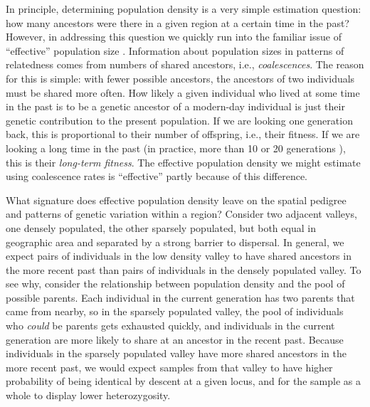 \documentclass{ar-1col}
\begin{document}
In principle, determining population density is a very simple estimation question:
how many ancestors were there in a given region at a certain time in the past?
However, in addressing this question we quickly run into the familiar
issue of ``effective'' population size \citep{CharlesworthCharlesworthBarton2003}.
Information about population sizes in patterns of relatedness
comes from numbers of shared ancestors, i.e., \textit{coalescences}.
The reason for this is simple:
with fewer possible ancestors, the ancestors of two individuals
must be shared more often.
How likely a given individual who lived at some time in the past
is to be a genetic ancestor of a modern-day individual
is just their genetic contribution to the present population.
If we are looking one generation back, 
this is proportional to their number of offspring, i.e., their fitness.
If we are looking a long time in the past
(in practice, more than 10 or 20 generations \citep{bartonfitness}),
this is their \textit{long-term fitness}.
The effective population density we might estimate using coalescence rates
is ``effective'' partly because of this difference.

What signature does effective population density leave 
on the spatial pedigree and patterns of genetic variation
within a region?
Consider two adjacent valleys, 
one densely populated, the other sparsely populated, 
but both equal in geographic area 
and separated by a strong barrier to dispersal.
In general, we expect pairs of individuals in the low density valley 
to have shared ancestors in the more recent past than 
pairs of individuals in the densely populated valley.
To see why, consider the relationship between population density
and the pool of possible parents.
Each individual in the current generation has two parents that came from nearby,
so in the sparsely populated valley,
the pool of individuals who \textit{could} be parents gets exhausted quickly,
and individuals in the current generation
are more likely to share at an ancestor in the recent past.
Because individuals in the sparsely populated valley have more shared ancestors 
in the more recent past, 
we would expect samples from that valley to have higher probability of being identical by descent 
at a given locus, 
and for the sample as a whole to display lower heterozygosity.
\end{document}

